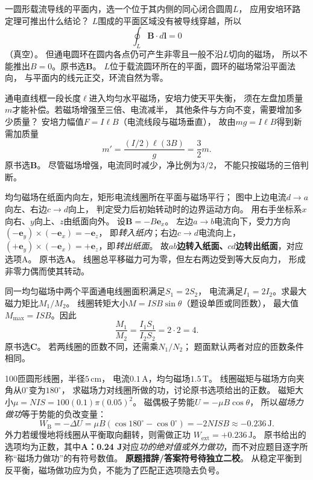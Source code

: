 \problemtext 一圆形载流导线的平面内，选一个位于其内侧的同心闭合圆周$L$，
应用安培环路定理可推出什么结论？
\workings
$L$围成的平面区域没有被导线穿越，所以
\[
\boxed{\oint_L\bm B\cdot d\bm l=0}
\]
（真空）。
但通电圆环在圆内各点仍可产生非零且一般不沿$L$切向的磁场，
所以不能推出$B=0$。原书选\textbf{B}。
\crosscheck $L$位于载流圆环所在的平面，圆环的磁场常沿平面法向，
与平面内的线元正交，环流自然为零。

\problemtext 通电直线框一段长度$\ell$进入均匀水平磁场，安培力使天平失衡，
须在左盘加质量$m$才能补偿。若磁场增强至三倍、电流减半，
其他条件与方向不变，需要增加多少质量？
\workings
安培力幅值$F=I\ell B$（电流线段与磁场垂直），
故由$mg=I\ell B$得到新需加质量
\[
m'=\frac{(I/2)\ell(3B)}{g}=\boxed{\frac32m}.
\]
原书选\textbf{B}。
\crosscheck 尽管磁场增强，电流同时减少，净比例为$3/2$，
不能只按磁场的三倍判断。

\problemtext 均匀磁场在纸面内向左，矩形电流线圈所在平面与磁场平行；
图中上边电流$d\to a$向左、右边$c\to d$向上，
判定受力后初始转动时的边界运动方向。
\workings
用右手坐标系$x$向右、$y$向上、$z$由纸面向外。
设$\bm B=-B\bm e_x$。
左边$a\to b$电流向下，受力方向
$(-\bm e_y)\times(-\bm e_x)=-\bm e_z$，
即\emph{转入纸内}；右边$c\to d$电流向上，
$(+\bm e_y)\times(-\bm e_x)=+\bm e_z$，即\emph{转出纸面}。
故\textbf{$ab$边转入纸面、$cd$边转出纸面}，对应选项A。
原书选\textbf{A}。
\crosscheck 线圈总平移磁力可为零，但左右两边受到等大反向力，
形成非零力偶而使其转动。

\problemtext 同一均匀磁场中两个平面通电线圈面积满足$S_1=2S_2$，
电流满足$I_1=2I_2$。求最大磁力矩比$M_1/M_2$。
\workings
线圈转矩大小$M=ISB\sin\theta$（题设单匝或同匝数），
最大值$M_{\max}=ISB$。因此
\[
\boxed{\frac{M_1}{M_2}=\frac{I_1S_1}{I_2S_2}=2\cdot2=4}.
\]
原书选\textbf{C}。
\crosscheck 若两线圈的匝数不同，还需乘$N_1/N_2$；
题面默认两者对应的匝数条件相同。

\problemtext 100匝圆形线圈，半径$5\,\mathrm{cm}$，
电流$0.1\,\mathrm A$，均匀磁场$1.5\,\mathrm T$。
线圈磁矩与磁场方向夹角从$0^\circ$变为$180^\circ$，
求磁场力对线圈所做的功，讨论原书选项给出的正数。
\workings
磁矩大小$\mu=NIS=100(0.1)\pi(0.05)^2$。
磁偶极子势能$U=-\mu B\cos\theta$，
所以\emph{磁场力做功}等于势能的负改变量：
\[
\boxed{W_{\mathrm B}
=-\Delta U=\mu B(\cos180^\circ-\cos0^\circ)
=-2NISB\approx-0.236\,\mathrm J}.
\]
外力若缓慢地将线圈从平衡取向翻转，则需做正功
$\boxed{W_{\mathrm{ext}}=+0.236\,\mathrm J}$。
原书给出的选项均为正数，其中\textbf{A：0.24 J}对应\emph{功的绝对值或外力做功}，而不对应题目逐字所称“磁场力做功”的有符号数值。
\crosscheck \textbf{原题措辞/答案符号待独立二校}。
从稳定平衡到反平衡，磁场做功应为负，不能为了匹配正选项隐去负号。

